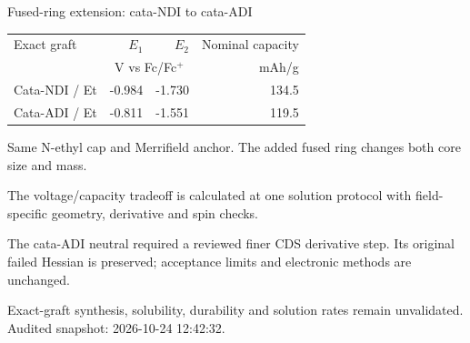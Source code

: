 \begin{frame}{Fused-ring extension: cata-NDI to cata-ADI}
\small\centering\renewcommand{\arraystretch}{1.25}
\begin{tabular}{@{}lrrr@{}}\toprule
Exact graft & $E_1$ & $E_2$ & Nominal capacity \\
& \multicolumn{2}{c}{V vs Fc/Fc$^+$} & mAh/g \\ \midrule
Cata-NDI / Et & -0.984 & -1.730 & 134.5 \\
Cata-ADI / Et & -0.811 & -1.551 & 119.5 \\
\bottomrule\end{tabular}\par\vspace{1.5ex}\raggedright
\footnotesize Same N-ethyl cap and Merrifield anchor. The added fused ring changes both core size and mass.
\par\vspace{1ex}The voltage/capacity tradeoff is calculated at one solution protocol with field-specific geometry, derivative and spin checks.
\par\vspace{1ex}The cata-ADI neutral required a reviewed finer CDS derivative step. Its original failed Hessian is preserved; acceptance limits and electronic methods are unchanged.
\par\vspace{1ex}\scriptsize Exact-graft synthesis, solubility, durability and solution rates remain unvalidated.
\vfill\scriptsize Audited snapshot: 2026-10-24 12:42:32.
\end{frame}
